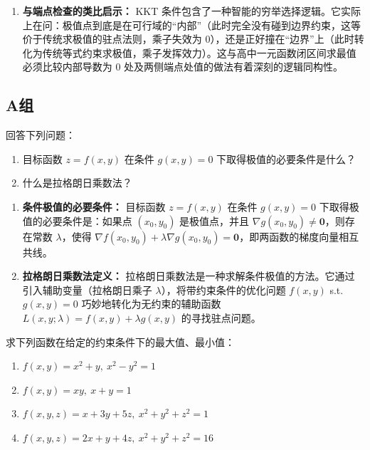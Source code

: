\documentclass[lang=cn,11pt]{elegantbook}
\begin{document}
\begin{solution}
\begin{enumerate}
  \item[(3)] \textbf{与端点检查的类比启示：}
  KKT 条件包含了一种智能的穷举选择逻辑。它实际上在问：极值点到底是在可行域的“内部”（此时完全没有碰到边界约束，这等价于传统求极值的驻点法则，乘子失效为 0），还是正好撞在“边界”上（此时转化为传统等式约束求极值，乘子发挥效力）。这与高中一元函数闭区间求最值必须比较内部导数为 0 处及两侧端点处值的做法有着深刻的逻辑同构性。
\end{enumerate}
\end{solution}

\subsection{A组}

\begin{exercise}[概念问答]
回答下列问题：
\begin{enumerate}
    \item[(1)] 目标函数 $z=f(x,y)$ 在条件 $g(x,y)=0$ 下取得极值的必要条件是什么？
    \item[(2)] 什么是拉格朗日乘数法？
\end{enumerate}
\end{exercise}

\begin{solution}
\begin{enumerate}
    \item[(1)] \textbf{条件极值的必要条件：}
    目标函数 $z=f(x,y)$ 在条件 $g(x,y)=0$ 下取得极值的必要条件是：如果点 $(x_0,y_0)$ 是极值点，并且 $\nabla g(x_0,y_0) \neq \boldsymbol{0}$，则存在常数 $\lambda$，使得 $\nabla f(x_0,y_0) + \lambda \nabla g(x_0,y_0) = \boldsymbol{0}$，即两函数的梯度向量相互共线。
    
    \item[(2)] \textbf{拉格朗日乘数法定义：}
    拉格朗日乘数法是一种求解条件极值的方法。它通过引入辅助变量（拉格朗日乘子 $\lambda$），将带约束条件的优化问题 $f(x,y)$ s.t. $g(x,y)=0$ 巧妙地转化为无约束的辅助函数 $L(x,y;\lambda) = f(x,y) + \lambda g(x,y)$ 的寻找驻点问题。
\end{enumerate}
\end{solution}

\begin{exercise}[拉格朗日乘数法求条件极值]
求下列函数在给定的约束条件下的最大值、最小值：
\begin{enumerate}
    \item[(1)] $f(x,y)=x^2+y,\ x^2-y^2=1$ 
    \item[(2)] $f(x,y)=xy,\ x+y=1$ 
    \item[(3)] $f(x,y,z)=x+3y+5z,\ x^2+y^2+z^2=1$ 
    \item[(4)] $f(x,y,z)=2x+y+4z,\ x^2+y^2+z^2=16$
\end{enumerate}
\end{exercise}
\end{document}
